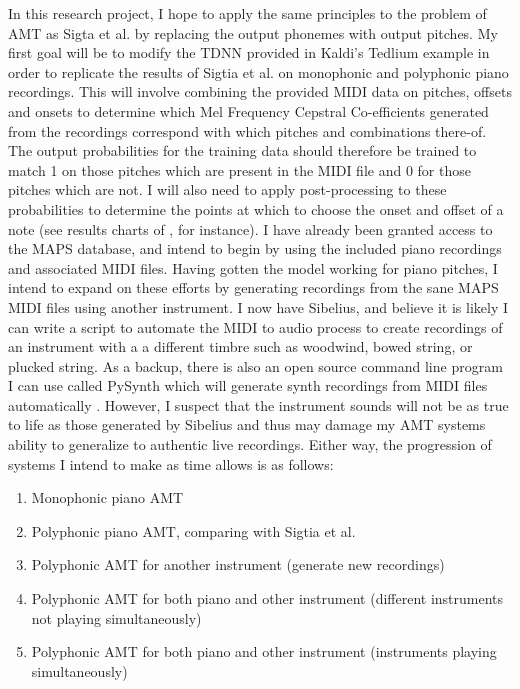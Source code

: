 \documentclass[conference]{IEEEtran}
\begin{document}
In this research project, I hope to apply the same principles to the problem of AMT as Sigta et al. by replacing the output phonemes with output pitches. My first goal will be to modify the TDNN provided in Kaldi's Tedlium example in order to replicate the results of Sigtia et al.  on monophonic and polyphonic piano recordings. This will involve combining the provided MIDI data on pitches, offsets and onsets to determine which Mel Frequency Cepstral Co-efficients generated from the recordings correspond with which pitches and combinations there-of. The output probabilities for the training data should therefore be trained to match 1 on those pitches which are present in the MIDI file and 0 for those pitches which are not. I will also need to apply post-processing to these probabilities to determine the points at which to choose the onset and offset of a note (see results charts of \cite{sigtia}, for instance). I have already been granted access to the MAPS database, and intend to begin by using the included piano recordings and associated MIDI files. Having gotten the model working for piano pitches, I intend to expand on these efforts by generating recordings from the sane MAPS MIDI files using another instrument. I now have Sibelius, and believe it is likely I can write a script to automate the MIDI to audio process to create recordings of an instrument with a a different timbre such as woodwind, bowed string, or plucked string. As a backup, there is also an open source command line program I can use called PySynth which will generate synth recordings from MIDI files automatically \cite{doege}. However, I suspect that the instrument sounds will not be as true to life as those generated by Sibelius and thus may damage my AMT systems ability to generalize to authentic live recordings. Either way, the progression of systems I intend to make as time allows is as follows:

\begin{enumerate}
\item Monophonic piano AMT
\item Polyphonic piano AMT, comparing with Sigtia et al.
\item Polyphonic AMT for another instrument (generate new recordings)
\item Polyphonic AMT for both piano and other instrument (different instruments not playing simultaneously)
\item Polyphonic AMT for both piano and other instrument (instruments playing simultaneously)
\end{enumerate}
\end{document}
